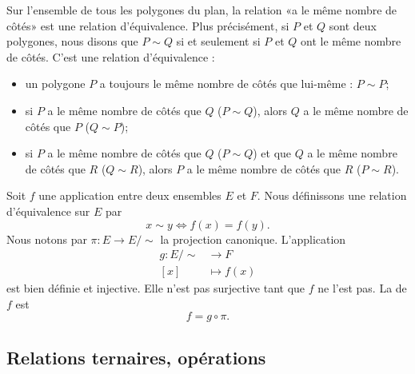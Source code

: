 \begin{example}     \label{EXooYDRVooHsANlC}
	Sur l'ensemble de tous les polygones du plan, la relation «a le même nombre de côtés» est une relation d'équivalence. Plus précisément, si \( P\) et \( Q\) sont deux polygones, nous disons que \( P\sim Q\) si et seulement si \( P\) et \( Q\) ont le même nombre de côtés. C'est une relation d'équivalence :
	\begin{itemize}
		\item
		      un polygone \( P\) a toujours le même nombre de côtés que lui-même : \( P\sim P\);
		\item
		      si \( P\) a le même nombre de côtés que \( Q\) (\( P\sim Q\)), alors \( Q\) a le même nombre de côtés que \( P\) (\( Q\sim P\));
		\item
		      si \( P\) a le même nombre de côtés que \( Q\) (\( P\sim Q\)) et que \( Q\) a le même nombre de côtés que \( R\) (\( Q\sim R\)), alors \( P\) a le même nombre de côtés que \( R\) (\( P\sim R\)).
	\end{itemize}
\end{example}

\begin{example}\label{EXooProjCanoniqueEquivAppl}
	Soit \( f\) une application entre deux ensembles \( E\) et \( F\). Nous définissons une relation d'équivalence sur \( E\) par
	\begin{equation}
		x\sim y\Leftrightarrow f(x)=f(y).
	\end{equation}
	Nous notons par \( \pi\colon E\to E/\sim\) la projection canonique. L'application
	\begin{equation}
		\begin{aligned}
			g\colon E/\sim & \to F        \\
			[x]            & \mapsto f(x)
		\end{aligned}
	\end{equation}
	est bien définie et injective. Elle n'est pas surjective tant que \( f\) ne l'est pas. La  de \( f\) est
	\begin{equation}
		f=g\circ\pi.
	\end{equation}
\end{example}

\subsection{Relations ternaires, opérations}
\label{SUBooRelationsTernaires}

